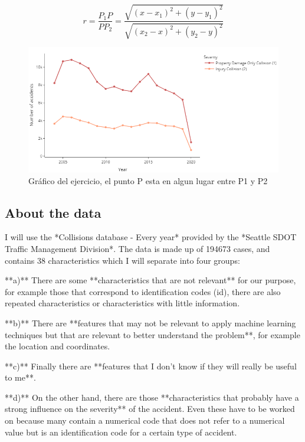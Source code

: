 \documentclass[12pt]{article}
\begin{document}
 
\begin{equation}
  r=\frac{P_{1}P}{PP_{2}}=\frac{\sqrt{(x-x_{1})^{2}+(y-y_{1})^{2}}}{\sqrt{(x_{2}-x)^{2}+(y_{2}-y)^{2}}}
  \label{eq:razon}
  \end{equation}
  \begin{figure}[htbp]
    \centering
      \includegraphics[width=1\textwidth]{../images/years.png}
    \caption{Gráfico del ejercicio, el punto P esta en algun lugar entre P1 y P2}
    \label{fig:ejemplo}
  \end{figure}


\subsection*{About the data}
I will use the *Collisions database - Every year* provided by the *Seattle SDOT Traffic Management Division*. The data is made up of 194673 cases, and contains 38 characteristics which I will separate into four groups:

**a)** There are some **characteristics that are not relevant** for our purpose, for example those that correspond to identification codes (id), there are also repeated characteristics or characteristics with little information.

**b)** There are **features that may not be relevant to apply machine learning techniques but that are relevant to better understand the problem**, for example the location and coordinates.

**c)** Finally there are **features that I don't know if they will really be useful to me**.

**d)** On the other hand, there are those **characteristics that probably have a strong influence on the severity** of the accident. Even these have to be worked on because many contain a numerical code that does not refer to a numerical value but is an identification code for a certain type of accident.
\end{document}
